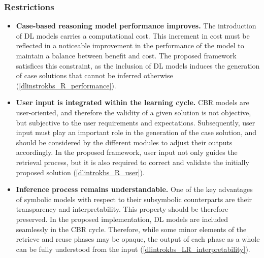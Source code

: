 \subsubsection*{Restrictions}
\begin{itemize}
    \item \textbf{Case-based reasoning model performance improves.} The introduction of DL models carries a computational cost. This increment in cost must be reflected in a noticeable improvement in the performance of the model to maintain a balance between benefit and cost. The proposed framework satisfices this constraint, as the inclusion of DL models induces the generation of case solutions that cannot be inferred otherwise (\ref{dlinstrokbs_R_performance}).
    
    \item \textbf{User input is integrated within the learning cycle.} CBR models are user-oriented, and therefore the validity of a given solution is not objective, but subjective to the user requirements and expectations. Subsequently, user input must play an important role in the generation of the case solution, and should be considered by the different modules to adjust their outputs accordingly. In the proposed framework, user input not only guides the retrieval process, but it is also required to correct and validate the initially proposed solution (\ref{dlintrokbs_R_user}). 
    
    \item \textbf{Inference process remains understandable.} One of the key advantages of symbolic models with respect to their subsymbolic counterparts are their transparency and interpretability. This property should be therefore preserved. In the proposed implementation, DL models are included seamlessly in the CBR cycle. Therefore, while some minor elements of the retrieve and reuse phases may be opaque, the output of each phase as a whole can be fully understood from the input (\ref{dlintrokbs_LR_interpretability}).
\end{itemize}
